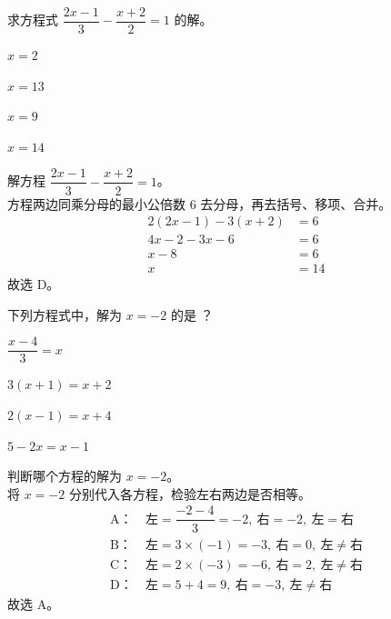 \documentclass[12pt,a4paper,fontset=none]{exam-zh}
\begin{document}
\begin{question}
    求方程式 $\dfrac{2x-1}{3}-\dfrac{x+2}{2}=1$ 的解。 \paren[D]
    \begin{choices}
        \item $x=2$
        \item $x=13$
        \item $x=9$
        \item $x=14$
    \end{choices}
\end{question}

\begin{solution}
    解方程 $\dfrac{2x-1}{3}-\dfrac{x+2}{2}=1$。 \\
    方程两边同乘分母的最小公倍数 $6$ 去分母，再去括号、移项、合并。
    \begin{align*}
        2(2x-1)-3(x+2) &= 6 \\
        4x-2-3x-6 &= 6 \\
        x-8 &= 6 \\
        x &= 14
    \end{align*}
    故选 D。
\end{solution}

\begin{question}
    下列方程式中，解为 $x=-2$ 的是 \paren[A]？
    \begin{choices}
        \item $\dfrac{x-4}{3}=x$
        \item $3(x+1)=x+2$
        \item $2(x-1)=x+4$
        \item $5-2x=x-1$
    \end{choices}
\end{question}

\begin{solution}
    判断哪个方程的解为 $x=-2$。 \\
    将 $x=-2$ 分别代入各方程，检验左右两边是否相等。
    \begin{align*}
        \text{A：}\ & \text{左}=\dfrac{-2-4}{3}=-2,\ \text{右}=-2,\ \text{左}=\text{右} \\
        \text{B：}\ & \text{左}=3\times(-1)=-3,\ \text{右}=0,\ \text{左}\neq\text{右} \\
        \text{C：}\ & \text{左}=2\times(-3)=-6,\ \text{右}=2,\ \text{左}\neq\text{右} \\
        \text{D：}\ & \text{左}=5+4=9,\ \text{右}=-3,\ \text{左}\neq\text{右}
    \end{align*}
    故选 A。
\end{solution}
\end{document}
